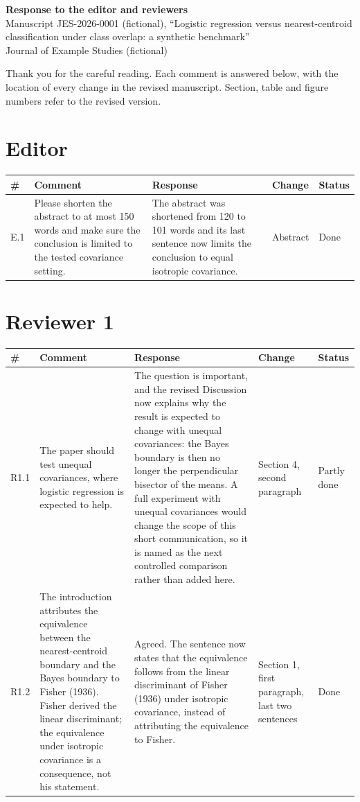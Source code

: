 \documentclass[10pt]{article}
\begin{document}
\begin{center}{\large\textbf{Response to the editor and reviewers}}\\[4pt]
Manuscript JES-2026-0001 (fictional), ``Logistic regression versus nearest-centroid classification under class overlap: a synthetic benchmark''\\ Journal of Example Studies (fictional)
\end{center}
Thank you for the careful reading. Each comment is answered below, with the location of every change in the revised manuscript. Section, table and figure numbers refer to the revised version.
\section*{Editor}
{\small\begin{longtable}{@{}P{0.9cm}P{4.4cm}P{6.6cm}P{2.6cm}P{1.5cm}@{}}
\toprule
\textbf{\#} & \textbf{Comment} & \textbf{Response} & \textbf{Change} & \textbf{Status} \\ \midrule
\endhead
\bottomrule
\endfoot
E.1 & Please shorten the abstract to at most 150 words and make sure the conclusion is limited to the tested covariance setting. & The abstract was shortened from 120 to 101 words and its last sentence now limits the conclusion to equal isotropic covariance. & Abstract & Done \\ \midrule
\end{longtable}}
\section*{Reviewer 1}
{\small\begin{longtable}{@{}P{0.9cm}P{4.4cm}P{6.6cm}P{2.6cm}P{1.5cm}@{}}
\toprule
\textbf{\#} & \textbf{Comment} & \textbf{Response} & \textbf{Change} & \textbf{Status} \\ \midrule
\endhead
\bottomrule
\endfoot
R1.1 & The paper should test unequal covariances, where logistic regression is expected to help. & The question is important, and the revised Discussion now explains why the result is expected to change with unequal covariances: the Bayes boundary is then no longer the perpendicular bisector of the means. A full experiment with unequal covariances would change the scope of this short communication, so it is named as the next controlled comparison rather than added here. & Section 4, second paragraph & Partly done \\ \midrule
R1.2 & The introduction attributes the equivalence between the nearest-centroid boundary and the Bayes boundary to Fisher (1936). Fisher derived the linear discriminant; the equivalence under isotropic covariance is a consequence, not his statement. & Agreed. The sentence now states that the equivalence follows from the linear discriminant of Fisher (1936) under isotropic covariance, instead of attributing the equivalence to Fisher. & Section 1, first paragraph, last two sentences & Done \\ \midrule
\end{longtable}}
\end{document}
